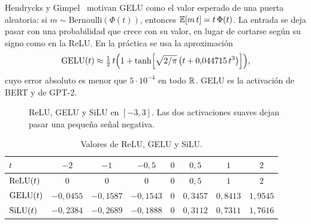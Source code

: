 Hendrycks y Gimpel~\cite{hendrycks} motivan GELU como el valor esperado de una puerta aleatoria: si $m\sim\mathrm{Bernoulli}(\Phi(t))$, entonces $\mathbb{E}[m\,t]=t\,\Phi(t)$. La entrada se deja pasar con una probabilidad que crece con su valor, en lugar de cortarse según su signo como en la ReLU. En la práctica se usa la aproximación
\[
\operatorname{GELU}(t)\approx\tfrac12\,t\Bigl(1+\tanh\Bigl[\sqrt{2/\pi}\,\bigl(t+0{,}044715\,t^{3}\bigr)\Bigr]\Bigr),
\]
cuyo error absoluto es menor que $5\cdot 10^{-4}$ en todo $\mathbb{R}$. GELU es la activación de BERT y de GPT-2.

\begin{figure}[h]
\centering
{}
\caption{ReLU, GELU y SiLU en $[-3,3]$. Las dos activaciones suaves dejan pasar una pequeña señal negativa.}\label{fig:activaciones}
\end{figure}

\begin{table}[h]
\centering\small
\caption{Valores de ReLU, GELU y SiLU.}\label{tab:activaciones}
\begin{tabular}{@{}lccccccc@{}}
\toprule
$t$ & $-2$ & $-1$ & $-0{,}5$ & $0$ & $0{,}5$ & $1$ & $2$ \\
\midrule
$\operatorname{ReLU}(t)$ & $0$ & $0$ & $0$ & $0$ & $0{,}5$ & $1$ & $2$ \\
$\operatorname{GELU}(t)$ & $-0{,}0455$ & $-0{,}1587$ & $-0{,}1543$ & $0$ & $0{,}3457$ & $0{,}8413$ & $1{,}9545$ \\
$\operatorname{SiLU}(t)$ & $-0{,}2384$ & $-0{,}2689$ & $-0{,}1888$ & $0$ & $0{,}3112$ & $0{,}7311$ & $1{,}7616$ \\
\bottomrule
\end{tabular}
\end{table}

